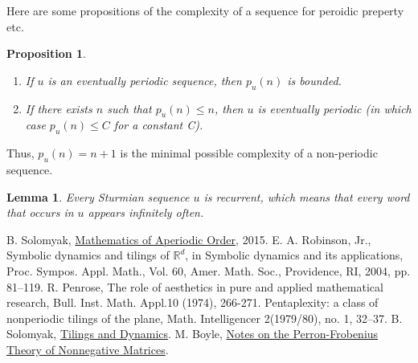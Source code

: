 \documentclass{article}
\theoremstyle{plain}
\newtheorem{lem}[thm]{Lemma}
\newtheorem{prop}[thm]{Proposition}
\theoremstyle{definition}
\theoremstyle{remark}
\begin{document}
Here are some propositions of the complexity of a sequence for peroidic preperty etc.

\begin{prop}
\begin{enumerate}
\item[(1)] If $u$ is an eventually periodic sequence, then $p_u(n)$ is bounded.
\item[(2)] If there exists $n$ such that $p_u(n) \leq n$, then $u$ is eventually periodic (in which case $p_u(n) \leq C$ for a constant C).
\end{enumerate}
\end{prop}

Thus, $p_u(n) = n + 1$ is the minimal possible complexity of a non-periodic sequence.

\begin{lem}
Every Sturmian sequence $u$ is recurrent, which means that every word that occurs in $u$ appears infinitely often.
\end{lem}



\begin{thebibliography}{99}
 B. Solomyak, \href{http://u.math.biu.ac.il/~solomyb/GRAD/14/Aper/Aperiodic.docx}{Mathematics of Aperiodic Order}, 2015.
 E. A. Robinson, Jr., Symbolic dynamics and tilings of $\mathbb{R}^d$, in Symbolic dynamics and its applications, Proc. Sympos. Appl. Math., Vol. 60, Amer. Math. Soc., Providence, RI, 2004, pp. 81–119.
 R. Penrose, The role of aesthetics in pure and applied mathematical research, Bull. Inst. Math. Appl.10 (1974), 266-271. Pentaplexity: a class of nonperiodic tilings of the plane, Math. Intelligencer 2(1979/80), no. 1, 32–37.
 B. Solomyak, \href{https://www.math.washington.edu/~solomyak/PREPRINTS/notes6.pdf}{Tilings and Dynamics}.
 M. Boyle, \href{http://www.math.umd.edu/~mboyle/courses/475sp05/spec.pdf}{Notes on the Perron-Frobenius Theory of Nonnegative Matrices}.

\end{thebibliography}
\end{document}
